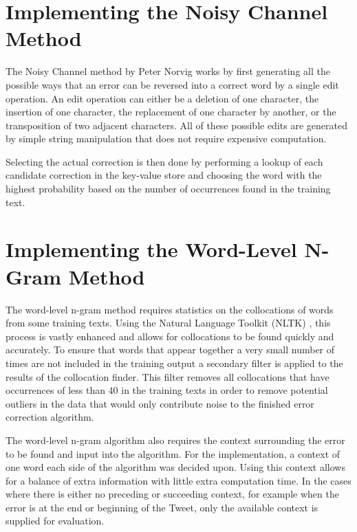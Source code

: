 \section{Implementing the Noisy Channel Method}
The Noisy Channel method by Peter Norvig works by first generating all the possible ways that an error can be reversed into a correct word by a single edit operation. An edit operation can either be a deletion of one character, the insertion of one character, the replacement of one character by another, or the transposition of two adjacent characters. All of these possible edits are generated by simple string manipulation that does not require expensive computation.

Selecting the actual correction is then done by performing a lookup of each candidate correction in the key-value store and choosing the word with the highest probability based on the number of occurrences found in the training text.

\section{Implementing the Word-Level N-Gram Method}
The word-level n-gram method requires statistics on the collocations of words from some training texts. Using the Natural Language Toolkit (NLTK) \cite{}, this process is vastly enhanced and allows for collocations to be found quickly and accurately. To ensure that words that appear together a very small number of times are not included in the training output a secondary filter is applied to the results of the collocation finder. This filter removes all collocations that have occurrences of less than 40 in the training texts in order to remove potential outliers in the data that would only contribute noise to the finished error correction algorithm.

The word-level n-gram algorithm also requires the context surrounding the error to be found and input into the algorithm. For the implementation, a context of one word each side of the algorithm was decided upon. Using this context allows for a balance of extra information with little extra computation time. In the cases where there is either no preceding or succeeding context, for example when the error is at the end or beginning of the Tweet, only the available context is supplied for evaluation.

